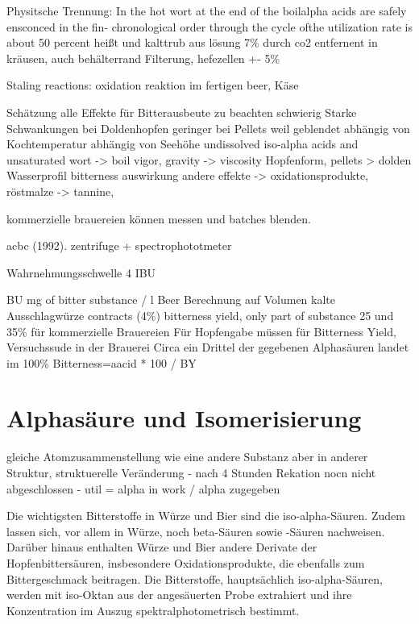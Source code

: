\documentclass[a4paper,parskip=half]{scrartcl}
\begin{document}
Physitsche Trennung: In the hot wort at the end of the boilalpha acids are safely ensconced in the fin-
chronological order through the cycle ofthe utilization rate is about 50 percent
heißt und kalttrub aus lösung 7\%
durch co2 entfernent in kräusen, auch behälterrand
Filterung, hefezellen +- 5\%

Staling reactions: oxidation reaktion im fertigen beer, Käse

\parencite[58]{Hall1997}
Schätzung alle Effekte für Bitterausbeute zu beachten schwierig
Starke Schwankungen bei Doldenhopfen
geringer bei Pellets weil geblendet
abhängig von Kochtemperatur abhängig von Seehöhe
undissolved iso-alpha acids and unsaturated wort -> boil vigor, gravity -> viscosity
Hopfenform, pellets > dolden
Wasserprofil bitterness auswirkung
andere effekte -> oxidationsprodukte, röstmalze -> tannine, 

kommerzielle brauereien können messen und batches blenden.

acbc (1992). zentrifuge + spectrophototmeter

Wahrnehmungsschwelle 4 IBU





\parencite[320]{Kunze2004}
BU mg of bitter substance / l Beer
Berechnung auf Volumen kalte Ausschlagwürze contracts (4\%)
bitterness yield, only part of substance
25 und 35\% für kommerzielle Brauereien
Für Hopfengabe müssen für Bitterness Yield, Versuchssude in der Brauerei
Circa ein Drittel der gegebenen Alphasäuren landet im 
100\% Bitterness=aacid * 100 / BY


\section*{Alphasäure und Isomerisierung}

\parencite[51]{Davidson1997} gleiche Atomzusammenstellung wie
eine andere Substanz aber in anderer Struktur, struktuerelle
Veränderung
- nach 4 Stunden Rekation nocn nicht abgeschlossen
- util = alpha in work / alpha zugegeben

\parencite{MEBAK2020}
Die wichtigsten Bitterstoffe in Würze und Bier sind die iso-alpha-Säuren. Zudem lassen sich, vor allem in Würze, noch beta-Säuren sowie -Säuren nachweisen. Darüber hinaus enthalten Würze und Bier andere Derivate der Hopfenbittersäuren, insbesondere Oxidationsprodukte, die ebenfalls zum Bittergeschmack beitragen.
Die Bitterstoffe, hauptsächlich iso-alpha-Säuren, werden mit iso-Oktan aus der
angesäuerten Probe extrahiert und ihre Konzentration im Auszug spektralphotometrisch bestimmt.
\end{document}
